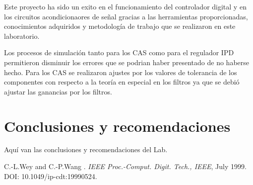 \documentclass[12pt,a4paper]{article} %
\begin{document}
Este proyecto ha sido un exito en el funcionamiento del controlador digital y en los circuitos acondicionaores de señal gracias a las herramientas proporcionadas, conocimientos adquiridos y metodología de trabajo que se realizaron en este laboratorio.

Los procesos de simulación tanto para los CAS como para el regulador IPD permitieron disminuir los errores que se podrian haber presentado de no haberse hecho. Para los CAS se realizaron ajustes por los valores de tolerancia de los componentes con respecto a la teoría en especial en los filtros ya que se debió ajustar las ganancias por los filtros.






\section{Conclusiones y recomendaciones}

Aquí van las conclusiones y recomendaciones del Lab.

\begin{thebibliography}{3}


C.-L.Wey and C.-P.Wang
.
\newblock \emph{IEEE Proc.-Comput. Digit. Tech., IEEE}, July 1999.
\newblock DOI: 10.1049/ip-cdt:19990524.

\end{thebibliography}
\end{document}
